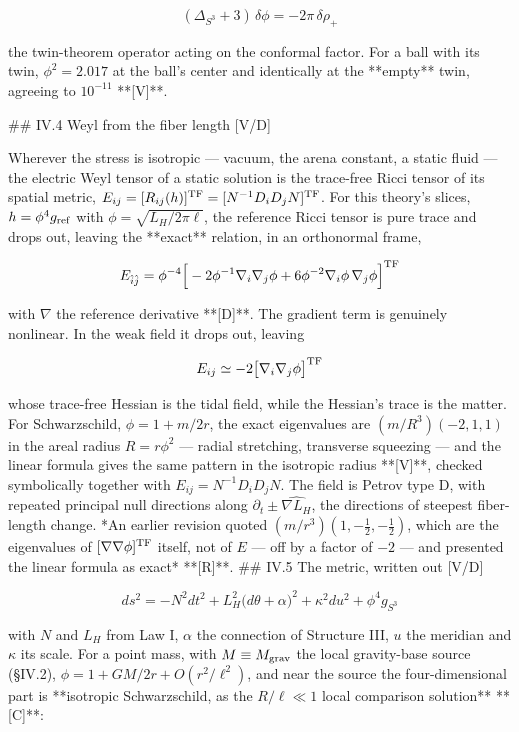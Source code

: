 $$(\Delta_{S^3}+3)\,\delta\phi = -2\pi\,\delta\rho_+$$

the twin-theorem operator acting on the conformal factor. For a ball with its twin, $\phi^2 = 2.017$ at the ball's center and identically at the **empty** twin, agreeing to $10^{-11}$ **[V]**.

## IV.4 Weyl from the fiber length [V/D]

Wherever the stress is isotropic — vacuum, the arena constant, a static fluid — the electric Weyl tensor of a static solution is the trace-free Ricci tensor of its spatial metric, $E_{ij} = [R_{ij}(h)]^{\rm TF} = [N^{-1}D_iD_jN]^{\rm TF}$. For this theory's slices, $h = \phi^4g_{\rm ref}$ with $\phi = \sqrt{L_H/2\pi\ell}$, the reference Ricci tensor is pure trace and drops out, leaving the **exact** relation, in an orthonormal frame,

$$E_{\hat i\hat j} = \phi^{-4}\Big[-2\phi^{-1}\nabla_i\nabla_j\phi+6\phi^{-2}\nabla_i\phi\,\nabla_j\phi\Big]^{\rm TF}$$

with $\nabla$ the reference derivative **[D]**. The gradient term is genuinely nonlinear. In the weak field it drops out, leaving

$$E_{ij}\simeq-2\big[\nabla_i\nabla_j\phi\big]^{\rm TF}$$

whose trace-free Hessian is the tidal field, while the Hessian's trace is the matter. For Schwarzschild, $\phi = 1+m/2r$, the exact eigenvalues are $(m/R^3)(-2,1,1)$ in the areal radius $R = r\phi^2$ — radial stretching, transverse squeezing — and the linear formula gives the same pattern in the isotropic radius **[V]**, checked symbolically together with $E_{ij} = N^{-1}D_iD_jN$. The field is Petrov type D, with repeated principal null directions along $\partial_t\pm\widehat{\nabla L_H}$, the directions of steepest fiber-length change. *An earlier revision quoted $(m/r^3)(1,-\tfrac12,-\tfrac12)$, which are the eigenvalues of $[\nabla\nabla\phi]^{\rm TF}$ itself, not of $E$ — off by a factor of $-2$ — and presented the linear formula as exact* **[R]**.
## IV.5 The metric, written out [V/D]

$$ds^2 = -N^2dt^2 + L_H^2\big(d\theta+\alpha\big)^2 + \kappa^2du^2 + \phi^4g_{S^3}$$

with $N$ and $L_H$ from Law I, $\alpha$ the connection of Structure III, $u$ the meridian and $\kappa$ its scale. For a point mass, with $M\equiv M_{\rm grav}$ the local gravity-base source (§IV.2), $\phi = 1 + GM/2r + O(r^2/\ell^2)$, and near the source the four-dimensional part is **isotropic Schwarzschild, as the $R/\ell\ll1$ local comparison solution** **[C]**:

